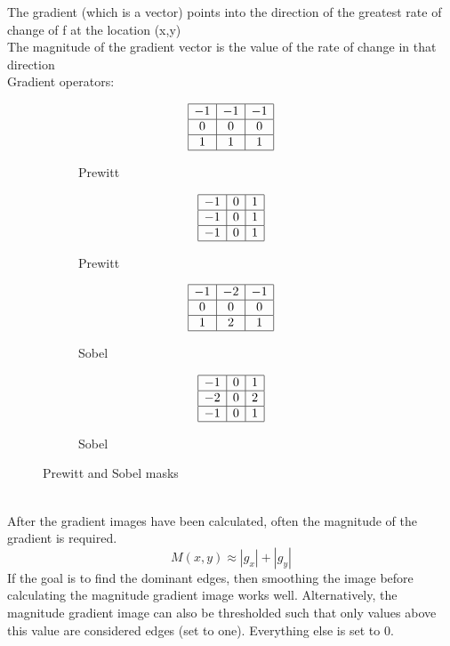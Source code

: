 The gradient (which is a vector) points into the direction of the greatest rate of change of f at the location (x,y)\\
The magnitude of the gradient vector is the value of the rate of change in that direction\\
Gradient operators:\\
\begin{figure}[h]
	\centering
	\begin{subfigure}[b]{0.2\textwidth}
		\centering
		\[
		\begin{array}{|c|c|c|}
			\hline
			-1 & -1 & -1\\
			\hline
			0 & 0 & 0\\
			\hline
			1 & 1 & 1\\
			\hline
		\end{array}
		\]
		\caption{Prewitt}
	\end{subfigure}
	\begin{subfigure}[b]{0.2\textwidth}
		\centering
		\[
		\begin{array}{|c|c|c|}
			\hline
			-1 & 0 & 1\\
			\hline
			-1 & 0 & 1\\
			\hline
			-1 & 0 & 1\\
			\hline
		\end{array}
		\]
		\caption{Prewitt}
	\end{subfigure}
	\begin{subfigure}[b]{0.2\textwidth}
		\centering
		\[
		\begin{array}{|c|c|c|}
			\hline
			-1 & -2 & -1\\
			\hline
			0 & 0 & 0\\
			\hline
			1 & 2 & 1\\
			\hline
		\end{array}
		\]
		\caption{Sobel}
	\end{subfigure}
	\begin{subfigure}[b]{0.2\textwidth}
		\centering
		\[
		\begin{array}{|c|c|c|}
			\hline
			-1 & 0 & 1\\
			\hline
			-2 & 0 & 2\\
			\hline
			-1 & 0 & 1\\
			\hline
		\end{array}
		\]
		\caption{Sobel}
	\end{subfigure}
	\caption{Prewitt and Sobel masks}
\end{figure}\\
After the gradient images have been calculated, often the magnitude of the gradient is required.
\[
	M(x,y) \approx |g_x|+|g_y|
\]
If the goal is to find the dominant edges, then smoothing the image before calculating the magnitude gradient image works well. Alternatively, the magnitude gradient image can also be thresholded such that only values above this value are considered edges (set to one). Everything else is set to 0.

